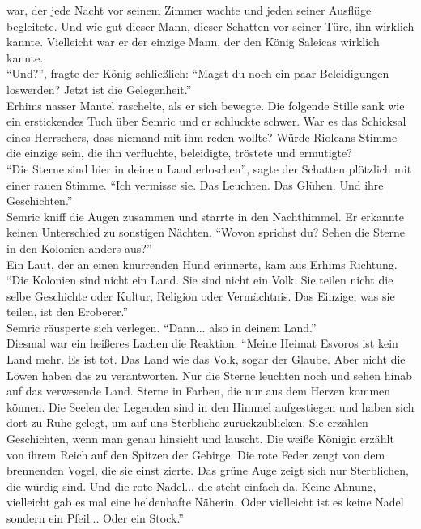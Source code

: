 war, der jede Nacht 
vor seinem Zimmer wachte und jeden seiner Ausflüge begleitete. Und wie gut 
dieser Mann, dieser 
Schatten vor seiner Türe, ihn wirklich kannte. Vielleicht war er der einzige 
Mann, der den König 
Saleicas wirklich kannte.\\
``Und?'', fragte der König schließlich: ``Magst du noch ein paar Beleidigungen 
loswerden? Jetzt ist 
die Gelegenheit.''\\
Erhims nasser Mantel raschelte, als er sich bewegte. Die folgende Stille sank 
wie ein erstickendes 
Tuch über Semric und er schluckte schwer. War es das Schicksal eines 
Herrschers, dass niemand mit 
ihm reden wollte? Würde Rioleans Stimme die einzige sein, die ihn verfluchte, 
beleidigte, tröstete 
und ermutigte? \\
``Die Sterne sind hier in deinem Land erloschen'', sagte der Schatten plötzlich 
mit einer rauen 
Stimme. ``Ich vermisse sie. Das Leuchten. Das Glühen. Und ihre Geschichten.''\\
Semric kniff die Augen zusammen und starrte in den Nachthimmel. Er erkannte 
keinen Unterschied zu 
sonstigen Nächten. ``Wovon sprichst du? Sehen die Sterne in den Kolonien anders 
aus?''\\
Ein Laut, der an einen knurrenden Hund erinnerte, kam aus Erhims Richtung. 
``Die Kolonien sind 
nicht ein Land. Sie sind nicht ein Volk. Sie teilen nicht die selbe Geschichte 
oder Kultur, Religion 
oder Vermächtnis. Das Einzige, was sie teilen, ist den Eroberer.''\\
Semric räusperte sich verlegen. ``Dann... also in deinem Land.''\\
Diesmal war ein heißeres Lachen die Reaktion. ``Meine Heimat Esvoros ist kein 
Land mehr. Es ist 
tot. Das Land wie das Volk, sogar der Glaube. Aber nicht die Löwen haben das zu 
verantworten. Nur 
die Sterne leuchten noch und sehen hinab auf das verwesende Land. Sterne in 
Farben, die nur aus dem 
Herzen kommen können. Die Seelen der Legenden sind in den Himmel aufgestiegen 
und haben sich dort 
zu Ruhe gelegt, um auf uns Sterbliche zurückzublicken. Sie erzählen 
Geschichten, wenn man genau 
hinsieht und lauscht. Die weiße Königin erzählt von ihrem Reich auf den Spitzen 
der Gebirge. Die 
rote Feder zeugt von dem brennenden Vogel, die sie einst zierte. Das grüne Auge 
zeigt sich nur 
Sterblichen, die würdig sind. Und die rote Nadel... die steht einfach da. Keine 
Ahnung, vielleicht 
gab es mal eine heldenhafte Näherin. Oder vielleicht ist es keine Nadel sondern 
ein Pfeil... Oder 
ein Stock.''\\
